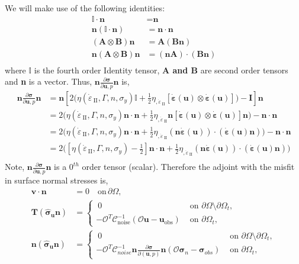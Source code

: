 \documentclass[12pt]{article}
\newcommand{\IIinv}{{\dot\varepsilon}_{\mathrm{\!\!\:II}}}
\newcommand{\uu}{{\ensuremath{\boldsymbol{u}}}}
\newcommand{\vv}{{\ensuremath{\boldsymbol{v}}}}
\newcommand{\ssigma}{{\ensuremath{\boldsymbol{\sigma}}}}
\newcommand{\strain}{{\ensuremath{\dot{\boldsymbol{\varepsilon}}}}}
\begin{document}
We will make use of the following identities:
\begin{equation}
\begin{split}
  \mathbb{I}\cdot\textbf{n} &= \textbf{n} \\
  \textbf{n}(\mathbb{I}\cdot\textbf{n}) &= \textbf{n}\cdot\textbf{n}\\
  (\textbf{A}\otimes\textbf{B})\textbf{n} &=\textbf{A}(\textbf{B}\textbf{n})\\
  \textbf{n}(\textbf{A}\otimes\textbf{B})\textbf{n} &= (\textbf{n}\textbf{A})\cdot (\textbf{B}\textbf{n}) \\
\end{split} 
\end{equation}
where $\mathbb{I}$ is the fourth order Identity tensor, \textbf{A and B} are second order tensors and \textbf{n} is a vector.
Thus, $\textbf{n}\frac{\partial \ssigma}{\partial \uu, p}\textbf{n}$ is,
\begin{equation}
\begin{split}
\textbf{n}\frac{\partial \ssigma}{\partial \uu, p}\textbf{n} &= \textbf{n}[2 \Big(\eta(\IIinv,\Gamma, n,\sigma_y)\mathbb{I}+\frac{1}{2} \eta_{,\IIinv} [\strain(\uu)\otimes
      \strain(\uu)]\Big) -\textbf{I}]\textbf{n} \\
&=2 \Big(\eta(\IIinv,\Gamma, n,\sigma_y)\textbf{n}\cdot\textbf{n}+\frac{1}{2} \eta_{,\IIinv} \textbf{n}[\strain(\uu)\otimes
  \strain(\uu)]\textbf{n}\Big) -\textbf{n}\cdot\textbf{n} \\
&=2 \Big(\eta(\IIinv,\Gamma, n,\sigma_y)\textbf{n}\cdot\textbf{n}+\frac{1}{2} \eta_{,\IIinv} (\textbf{n}\strain(\uu))
      \cdot (\strain(\uu)\textbf{n})\Big) -\textbf{n}\cdot\textbf{n} \\
&=2 \Big([\eta(\IIinv,\Gamma, n,\sigma_y)-\frac{1}{2}]\textbf{n}\cdot\textbf{n}+\frac{1}{2} \eta_{,\IIinv} (\textbf{n}\strain(\uu))
      \cdot (\strain(\uu)\textbf{n})\Big)  \\
\end{split}
\end{equation}
Note, $\textbf{n}\frac{\partial \ssigma}{\partial \uu, p}\textbf{n}$ is a $0^{th}$ order tensor (scalar). Therefore the adjoint with the misfit in surface normal stresses is,
\begin{align*}
  \vv\cdot \textbf{n}&=0 \quad \text{on} \, \partial \Omega, \\
  \textbf{T}(\hat\ssigma_\uu \textbf{n})
  &=\begin{cases} \:0 & \text{ on }\partial \Omega\setminus
  \partial\Omega_t, \\
  -\mathcal{O}^T\mathcal{C}^{-1}_{\text{noise}}(\mathcal O \uu-\uu_{\text{obs}}) &\text{ on }
  \partial\Omega_t,
  \end{cases} \\
  \textbf{n}(\hat\ssigma_\uu\textbf{n})
  &=\begin{cases} \:0 & \text{ on }\partial \Omega\setminus
  \partial\Omega_t, \\
  -\mathcal{O}^T\mathcal{C}^{-1}_{noise}\textbf{n}\frac{\partial \ssigma}{\partial (\uu,p)}\textbf{n}(\mathcal{O}\ssigma_n-\ssigma_{obs}) &\text{ on }
  \partial\Omega_t,
  \end{cases}  
  \label{eq:adjoint}
\end{align*}
\end{document}

